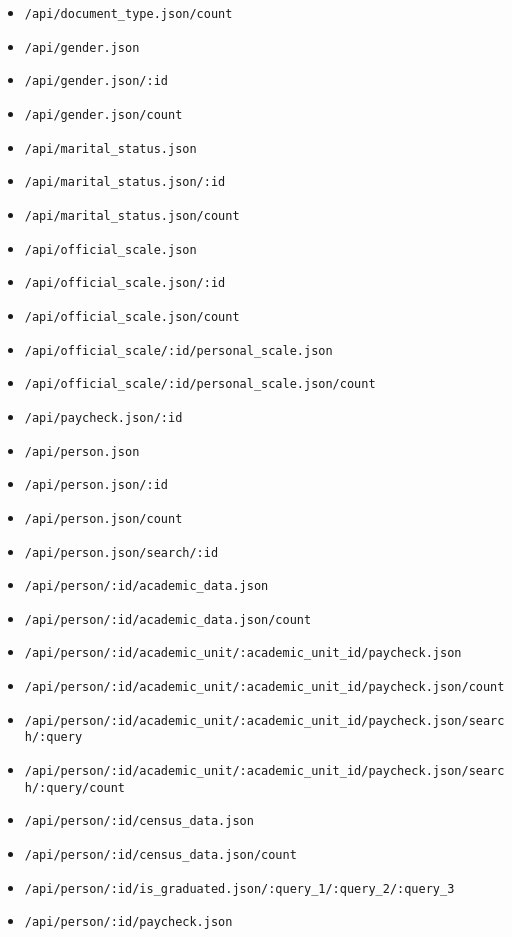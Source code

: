 \begin{itemize}
    \item \lstinline$/api/document_type.json/count$
    \item \lstinline$/api/gender.json$
    \item \lstinline$/api/gender.json/:id$
    \item \lstinline$/api/gender.json/count$
    \item \lstinline$/api/marital_status.json$
    \item \lstinline$/api/marital_status.json/:id$
    \item \lstinline$/api/marital_status.json/count$
    \item \lstinline$/api/official_scale.json$
    \item \lstinline$/api/official_scale.json/:id$
    \item \lstinline$/api/official_scale.json/count$
    \item \lstinline$/api/official_scale/:id/personal_scale.json$
    \item \lstinline$/api/official_scale/:id/personal_scale.json/count$
    \item \lstinline$/api/paycheck.json/:id$
    \item \lstinline$/api/person.json$
    \item \lstinline$/api/person.json/:id$
    \item \lstinline$/api/person.json/count$
    \item \lstinline$/api/person.json/search/:id$
    \item \lstinline$/api/person/:id/academic_data.json$
    \item \lstinline$/api/person/:id/academic_data.json/count$
    \item \lstinline$/api/person/:id/academic_unit/:academic_unit_id/paycheck.json$
    \item \lstinline$/api/person/:id/academic_unit/:academic_unit_id/paycheck.json/count$
    \item \lstinline$/api/person/:id/academic_unit/:academic_unit_id/paycheck.json/search/:query$
    \item \lstinline$/api/person/:id/academic_unit/:academic_unit_id/paycheck.json/search/:query/count$
    \item \lstinline$/api/person/:id/census_data.json$
    \item \lstinline$/api/person/:id/census_data.json/count$
    \item \lstinline$/api/person/:id/is_graduated.json/:query_1/:query_2/:query_3$
    \item \lstinline$/api/person/:id/paycheck.json$

\end{itemize}
